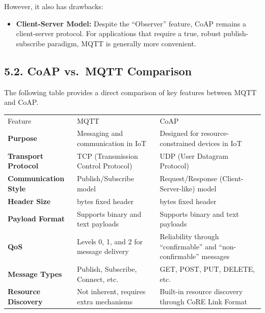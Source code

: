 \documentclass[a4paper, 12pt]{book} %
\begin{document}
However, it also has drawbacks:

\begin{itemize}
\tightlist
\item
  \textbf{Client-Server Model:} Despite the ``Observer'' feature, CoAP
  remains a client-server protocol. For applications that require a
  true, robust publish-subscribe paradigm, MQTT is generally more
  convenient.
\end{itemize}

\subsection{5.2. CoAP vs.~MQTT
Comparison}\label{coap-vs.-mqtt-comparison}

The following table provides a direct comparison of key features between
MQTT and CoAP.

\begin{longtable}[]{@{}
  >{\raggedright\arraybackslash}p{}
  >{\raggedright\arraybackslash}p{}
  >{\raggedright\arraybackslash}p{}@{}}
\toprule\noalign{}
\endhead
\bottomrule\noalign{}
\endlastfoot
Feature & MQTT & CoAP \\
\textbf{Purpose} & Messaging and communication in IoT & Designed for
resource-constrained devices in IoT \\
\textbf{Transport Protocol} & TCP (Transmission Control Protocol) & UDP
(User Datagram Protocol) \\
\textbf{Communication Style} & Publish/Subscribe model &
Request/Response (Client-Server-like) model \\
\textbf{Header Size} & 2 bytes fixed header & 4 bytes fixed header \\
\textbf{Payload Format} & Supports binary and text payloads & Supports
binary and text payloads \\
\textbf{QoS} & Levels 0, 1, and 2 for message delivery & Reliability
through ``confirmable'' and ``non-confirmable'' messages \\
\textbf{Message Types} & Publish, Subscribe, Connect, etc. & GET, POST,
PUT, DELETE, etc. \\
\textbf{Resource Discovery} & Not inherent, requires extra mechanisms &
Built-in resource discovery through CoRE Link Format \\
\end{longtable}


\end{document}
